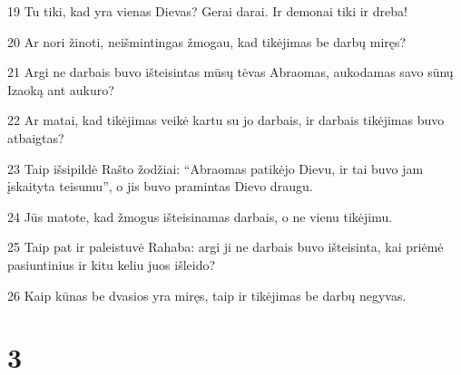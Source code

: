 \par 19 Tu tiki, kad yra vienas Dievas? Gerai darai. Ir demonai tiki ir dreba! 
\par 20 Ar nori žinoti, neišmintingas žmogau, kad tikėjimas be darbų miręs? 
\par 21 Argi ne darbais buvo išteisintas mūsų tėvas Abraomas, aukodamas savo sūnų Izaoką ant aukuro? 
\par 22 Ar matai, kad tikėjimas veikė kartu su jo darbais, ir darbais tikėjimas buvo atbaigtas? 
\par 23 Taip išsipildė Rašto žodžiai: “Abraomas patikėjo Dievu, ir tai buvo jam įskaityta teisumu”, o jis buvo pramintas Dievo draugu. 
\par 24 Jūs matote, kad žmogus išteisinamas darbais, o ne vienu tikėjimu. 
\par 25 Taip pat ir paleistuvė Rahaba: argi ji ne darbais buvo išteisinta, kai priėmė pasiuntinius ir kitu keliu juos išleido? 
\par 26 Kaip kūnas be dvasios yra miręs, taip ir tikėjimas be darbų negyvas.


\chapter{3}


